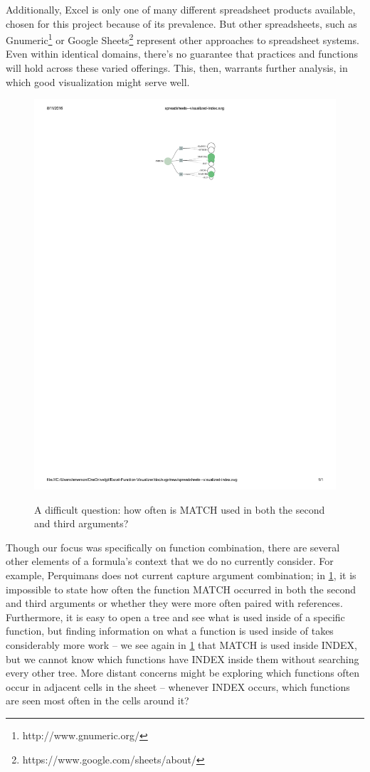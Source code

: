 \documentclass[conference]{IEEEtran}
\newcommand{\toolname}{Perquimans }
\begin{document}
	Additionally, Excel is only one of many different spreadsheet products
	available, chosen for this project because of its prevalence. But other
	spreadsheets, such as Gnumeric\footnote{http://www.gnumeric.org/} or Google
	Sheets\footnote{https://www.google.com/sheets/about/} represent other
	approaches to spreadsheet systems. Even within identical domains, there's no
	guarantee that practices and functions will hold across these varied offerings.
	This, then, warrants further analysis, in which good visualization might serve
	well. \par
	
	\begin{figure} \centering \includegraphics[width=.5\textwidth]{index}
		\label{fig:index} \caption{A difficult question: how often is MATCH used in
			both the second and third arguments?} \end{figure}
	
	Though our focus was specifically on function combination, there are several
	other elements of a formula's context that we do no currently consider. For
	example, \toolname does not current capture argument combination; in
	\ref{fig:index}, it is impossible to state how often the function MATCH
	occurred in both the second and third arguments or whether they were more often
	paired with references. Furthermore, it is easy to open a tree and see what is
	used inside of a specific function, but finding information on what a function
	is used inside of takes considerably more work -- we see again in
	\ref{fig:index} that MATCH is used inside INDEX, but we cannot know which
	functions have INDEX inside them without searching every other tree. More
	distant concerns might be exploring which functions often occur in adjacent
	cells in the sheet -- whenever INDEX occurs, which functions are seen most
	often in the cells around it?
	
\end{document}
